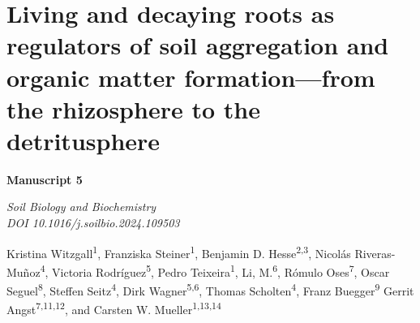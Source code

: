 \chapter{Living and decaying roots as regulators of soil aggregation and organic matter formation---from the rhizosphere to the detritusphere}
\label{chap:manuscript5} %

\begin{center}
    \textbf{\Large Manuscript 5}
  
    \vspace{0.3cm}
    \textit{Soil Biology and Biochemistry}\\
    \textit{DOI 10.1016/j.soilbio.2024.109503}
    
    \vspace{0.5cm}
    \begin{justify}
    Kristina Witzgall\textsuperscript{1}, Franziska Steiner\textsuperscript{1}, Benjamin D. Hesse\textsuperscript{2,3}, Nicolás Riveras-Muñoz\textsuperscript{4}, Victoria Rodríguez\textsuperscript{5}, Pedro Teixeira\textsuperscript{1}, Li, M.\textsuperscript{6}, Rómulo Oses\textsuperscript{7}, Oscar Seguel\textsuperscript{8}, Steffen Seitz\textsuperscript{4}, Dirk Wagner\textsuperscript{5,6}, Thomas Scholten\textsuperscript{4}, Franz Buegger\textsuperscript{9} Gerrit Angst\textsuperscript{7,11,12}, and Carsten W. Mueller\textsuperscript{1,13,14}
    \end{justify}
    \vspace{0.2cm}
  \end{center}
  
